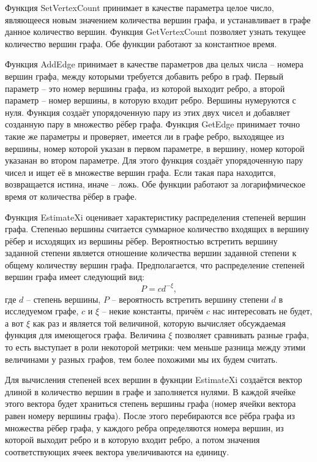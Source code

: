 \documentclass[14pt]{extreport}
\begin{document}
Функция SetVertexCount принимает в качестве параметра целое число, являющееся новым значением количества вершин графа, и устанавливает в графе данное количество вершин. Функция GetVertexCount позволяет узнать текущее количество вершин графа. Обе функции работают за константное время.

Функция AddEdge принимает в качестве параметров два целых числа -- номера вершин графа, между которыми требуется добавить ребро в граф. Первый параметр -- это номер вершины графа, из которой выходит ребро, а второй параметр -- номер вершины, в которую входит ребро. Вершины нумеруются с нуля. Функция создаёт упорядоченную пару из этих двух чисел и добавляет созданную пару в множество рёбер графа. Функция GetEdge принимает точно такие же параметры и проверяет, имеется ли в графе ребро, выходящее из вершины, номер которой указан в первом параметре, в вершину, номер которой указанан во втором параметре. Для этого функция создаёт упорядоченную пару чисел и ищет её в множестве вершин графа. Если такая пара находится, возвращается истина, иначе -- ложь. Обе функции работают за логарифмическое время от количества рёбер в графе.

Функция EstimateXi оценивает характеристику распределения степеней вершин графа. Степенью вершины считается суммарное количество входящих в вершину рёбер и исходящих из вершины рёбер. Вероятностью встретить вершину заданной степени является отношение количества вершин заданной степени к общему количеству вершин графа. Предполагается, что распределение степеней вершин графа имеет следующий вид:
$$
P = c d^{-\xi},
$$
где $d$ -- степень вершины, $P$ -- вероятность встретить вершину степени $d$ в исследуемом графе, $c$ и $\xi$ -- некие константы, причём $c$ нас интересовать не будет, а вот $\xi$ как раз и является той величиной, которую вычисляет обсуждаемая функция для имеющегося графа. Величина $\xi$ позволяет сравнивать разные графа, то есть выступает в роли некоторой метрики: чем меньше разница между этими величинами у разных графов, тем более похожими мы их будем считать.

Для вычисления степеней всех вершин в фукнции EstimateXi создаётся вектор длиной в количество вершин в графе и заполняется нулями. В каждой ячейке этого вектора будет храниться степень вершины графа (номер ячейки вектора равен номеру вершины графа). После этого перебираются все рёбра графа из множества рёбер графа, у каждого ребра определяются номера вершин, из которой выходит ребро и в которую входит ребро, а потом значения соответствующих ячеек вектора увеличиваются на единицу.
\end{document}
